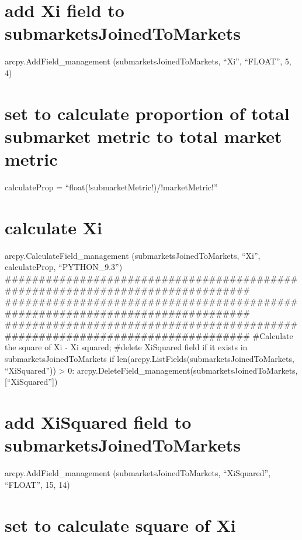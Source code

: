 \documentclass[]{article}
\begin{document}
\section{add Xi field to
submarketsJoinedToMarkets}\label{add-xi-field-to-submarketsjoinedtomarkets}

arcpy.AddField\_management (submarketsJoinedToMarkets, ``Xi'',
``FLOAT'', 5, 4)

\section{set to calculate proportion of total submarket metric to total
market
metric}\label{set-to-calculate-proportion-of-total-submarket-metric-to-total-market-metric}

calculateProp = ``float(!submarketMetric!)/!marketMetric!''

\section{calculate Xi}\label{calculate-xi}

arcpy.CalculateField\_management (submarketsJoinedToMarkets, ``Xi'',
calculateProp, ``PYTHON\_9.3'')
\#\#\#\#\#\#\#\#\#\#\#\#\#\#\#\#\#\#\#\#\#\#\#\#\#\#\#\#\#\#\#\#\#\#\#\#\#\#\#\#\#\#\#\#\#\#\#\#\#\#\#\#\#\#\#\#\#\#\#\#\#\#\#\#\#\#\#\#\#\#\#\#\#\#\#\#\#\#\#
\#\#\#\#\#\#\#\#\#\#\#\#\#\#\#\#\#\#\#\#\#\#\#\#\#\#\#\#\#\#\#\#\#\#\#\#\#\#\#\#\#\#\#\#\#\#\#\#\#\#\#\#\#\#\#\#\#\#\#\#\#\#\#\#\#\#\#\#\#\#\#\#\#\#\#\#\#\#\#
\#\#\#\#\#\#\#\#\#\#\#\#\#\#\#\#\#\#\#\#\#\#\#\#\#\#\#\#\#\#\#\#\#\#\#\#\#\#\#\#\#\#\#\#\#\#\#\#\#\#\#\#\#\#\#\#\#\#\#\#\#\#\#\#\#\#\#\#\#\#\#\#\#\#\#\#\#\#\#
\#Calculate the square of Xi - Xi squared; \#delete XiSquared field if
it exists in submarketsJoinedToMarkets if
len(arcpy.ListFields(submarketsJoinedToMarkets, ``XiSquared''))
\textgreater{} 0:
arcpy.DeleteField\_management(submarketsJoinedToMarkets,{[}``XiSquared''{]})

\section{add XiSquared field to
submarketsJoinedToMarkets}\label{add-xisquared-field-to-submarketsjoinedtomarkets}

arcpy.AddField\_management (submarketsJoinedToMarkets, ``XiSquared'',
``FLOAT'', 15, 14)

\section{set to calculate square of
Xi}\label{set-to-calculate-square-of-xi}
\end{document}
